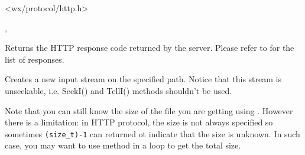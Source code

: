 \section{}\label{wxhttp}


\\
\\
\\


<wx/protocol/http.h>




, 


\label{wxhttpgetresponse}


Returns the HTTP response code returned by the server. Please refer to
 for the list of responses.


\label{wxhttpgetinputstream}


Creates a new input stream on the specified path. Notice that this stream is
unseekable, i.e. SeekI() and TellI() methods shouldn't be used.

Note that you can still know the size of the file you are getting using 
. However there is a
limitation: in HTTP protocol, the size is not always specified so sometimes
\texttt{(size\_t)-1} can returned ot indicate that the size is unknown. In such
case, you may want to use  
method in a loop to get the total size.


